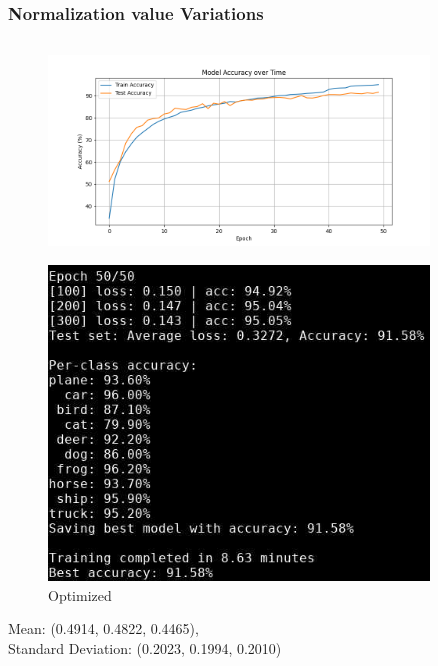 \documentclass{beamer}
\begin{document}
\begin{frame}
\frametitle{Normalization value Variations}
\begin{columns}
    \begin{column}{0.4\textwidth}
        \begin{figure}[t]
            \centering
            \vspace{-0.4cm}
            \includegraphics[width=0.9\textwidth]{media/cifar10_cnn_accuracy.png}
        \end{figure}
        \vspace{-0.6cm}
        \begin{figure}[t]
            \centering
            \includegraphics[width=0.9\textwidth]{media/cnn_epoch_50.png}
            \vspace{-0.3cm}
            \caption{Optimized}
        \end{figure}
        Mean: (0.4914, 0.4822, 0.4465),\\
        Standard Deviation: (0.2023, 0.1994, 0.2010)
    \end{column}


\end{columns}
\end{frame}
\end{document}
